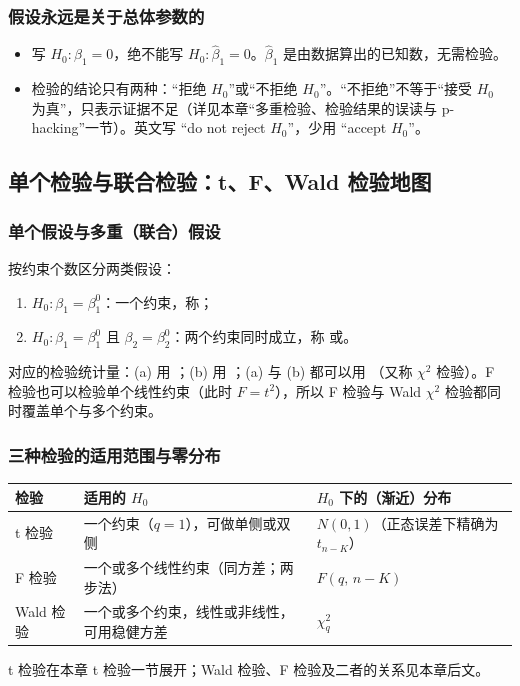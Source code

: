 \subsubsection{假设永远是关于总体参数的}

\begin{note}[假设的写法与结论的措辞]
\begin{itemize}
  \item 写 $H_0:\beta_1=0$，绝不能写 $H_0:\hat\beta_1=0$。$\hat\beta_1$ 是由数据算出的已知数，无需检验。
  \item 检验的结论只有两种：“拒绝 $H_0$”或“不拒绝 $H_0$”。“不拒绝”不等于“接受 $H_0$ 为真”，只表示证据不足（详见本章“多重检验、检验结果的误读与 p-hacking”一节）。英文写 “do not reject $H_0$”，少用 “accept $H_0$”。
\end{itemize}
\end{note}

\subsection{单个检验与联合检验：t、F、Wald 检验地图}

\subsubsection{单个假设与多重（联合）假设}

按约束个数区分两类假设：
\begin{enumerate}[label=(\alph*)]
  \item $H_0:\beta_1=\beta_1^0$：一个约束，称；
  \item $H_0:\beta_1=\beta_1^0$ 且 $\beta_2=\beta_2^0$：两个约束同时成立，称 或。
\end{enumerate}
对应的检验统计量：(a) 用 ；(b) 用 ；(a) 与 (b) 都可以用 （又称 $\chi^2$ 检验）。F 检验也可以检验单个线性约束（此时 $F=t^2$），所以 F 检验与 Wald $\chi^2$ 检验都同时覆盖单个与多个约束。

\subsubsection{三种检验的适用范围与零分布}

\begin{center}
\small
\begin{tabularx}{\linewidth}{@{}l L l@{}}
\toprule
检验 & 适用的 $H_0$ & $H_0$ 下的（渐近）分布\\
\midrule
t 检验 & 一个约束（$q=1$），可做单侧或双侧 & $N(0,1)$（正态误差下精确为 $t_{n-K}$）\\
F 检验 & 一个或多个线性约束（同方差；两步法） & $F(q,\,n-K)$\\
Wald 检验 & 一个或多个约束，线性或非线性，可用稳健方差 & $\chi^2_q$\\
\bottomrule
\end{tabularx}
\end{center}
t 检验在本章 t 检验一节展开；Wald 检验、F 检验及二者的关系见本章后文。

